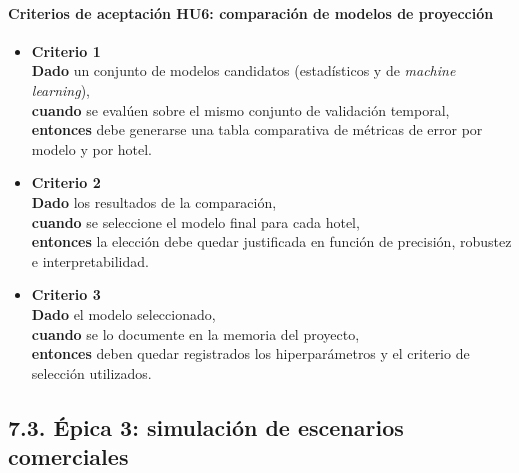 \documentclass[
11pt, %
]{charter}
\begin{document}
\paragraph{Criterios de aceptación HU6: comparación de modelos de proyección}
\begin{itemize}
  \item \textbf{Criterio 1} \\
  \textbf{Dado} un conjunto de modelos candidatos (estadísticos y de \textit{machine learning}), \\
  \textbf{cuando} se evalúen sobre el mismo conjunto de validación temporal, \\
  \textbf{entonces} debe generarse una tabla comparativa de métricas de error por modelo y por hotel.

  \item \textbf{Criterio 2} \\
  \textbf{Dado} los resultados de la comparación, \\
  \textbf{cuando} se seleccione el modelo final para cada hotel, \\
  \textbf{entonces} la elección debe quedar justificada en función de precisión, robustez e interpretabilidad.

  \item \textbf{Criterio 3} \\
  \textbf{Dado} el modelo seleccionado, \\
  \textbf{cuando} se lo documente en la memoria del proyecto, \\
  \textbf{entonces} deben quedar registrados los hiperparámetros y el criterio de selección utilizados.
\end{itemize}

\subsection*{7.3. Épica 3: simulación de escenarios comerciales}
\end{document}
